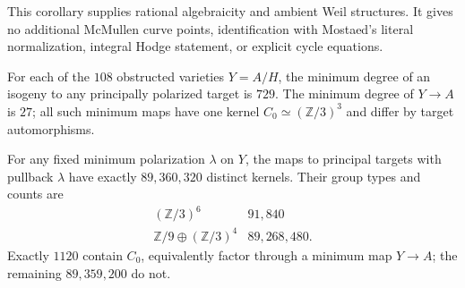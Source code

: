 This corollary supplies rational algebraicity and ambient Weil structures.
It gives no additional McMullen curve points, identification with
Mostaed's literal normalization, integral Hodge statement, or explicit
cycle equations.

\begin{theorem}
\label{pp:thm:obstructedisogenies}
For each of the $108$ obstructed varieties $Y=A/H$, the minimum degree
of an isogeny to any principally polarized target is $729$.
The minimum degree of $Y\to A$ is $27$; all such minimum maps have
one kernel $C_0\simeq(\mathbb Z/3)^3$ and differ by target automorphisms.

For any fixed minimum polarization $\lambda$ on $Y$, the maps to
principal targets with pullback $\lambda$ have exactly $89{,}360{,}320$
distinct kernels. Their group types and counts are
\[
\begin{array}{c|r}
(\mathbb Z/3)^6&91{,}840\\
\mathbb Z/9\oplus(\mathbb Z/3)^4&89{,}268{,}480.
\end{array}
\]
Exactly $1120$ contain $C_0$, equivalently factor through a minimum
map $Y\to A$; the remaining $89{,}359{,}200$ do not.
\end{theorem}
